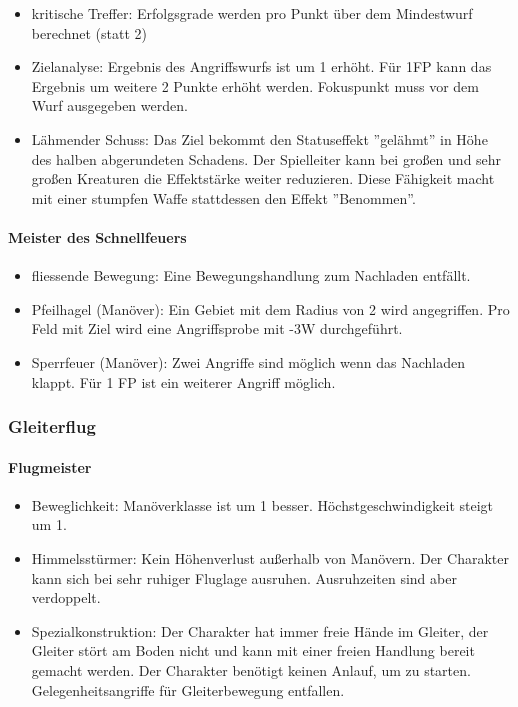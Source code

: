 \documentclass{article}
\begin{document}
\begin{itemize}
\item kritische Treffer: Erfolgsgrade werden pro Punkt über dem Mindestwurf berechnet (statt 2)
\item Zielanalyse: Ergebnis des Angriffswurfs ist um 1 erhöht. Für 1FP kann das Ergebnis um weitere 2 Punkte erhöht werden. Fokuspunkt muss vor dem Wurf ausgegeben werden.
\item Lähmender Schuss: Das Ziel bekommt den Statuseffekt ''gelähmt'' in Höhe des halben abgerundeten Schadens. Der Spielleiter kann bei großen und sehr großen Kreaturen die Effektstärke weiter reduzieren. Diese Fähigkeit macht mit einer stumpfen Waffe stattdessen den Effekt ''Benommen''.
\end{itemize}

\paragraph{Meister des Schnellfeuers}

\begin{itemize}
\item fliessende Bewegung: Eine Bewegungshandlung zum Nachladen entfällt.
\item Pfeilhagel (Manöver): Ein Gebiet mit dem Radius von 2 wird angegriffen. Pro Feld mit Ziel wird eine Angriffsprobe mit -3W durchgeführt.
\item Sperrfeuer (Manöver): Zwei Angriffe sind möglich wenn das Nachladen klappt. Für 1 FP ist ein weiterer Angriff möglich.
\end{itemize}

\subsubsection{Gleiterflug}

\paragraph{Flugmeister}

\begin{itemize}
\item Beweglichkeit: Manöverklasse ist um 1 besser. Höchstgeschwindigkeit steigt um 1.
\item Himmelsstürmer: Kein Höhenverlust außerhalb von Manövern. Der Charakter kann sich bei sehr ruhiger Fluglage ausruhen. Ausruhzeiten sind aber verdoppelt.
\item Spezialkonstruktion: Der Charakter hat immer freie Hände im Gleiter, der Gleiter stört am Boden nicht und kann mit einer freien Handlung bereit gemacht werden. Der Charakter benötigt keinen Anlauf, um zu starten. Gelegenheitsangriffe für Gleiterbewegung entfallen.
\end{itemize}
\end{document}
